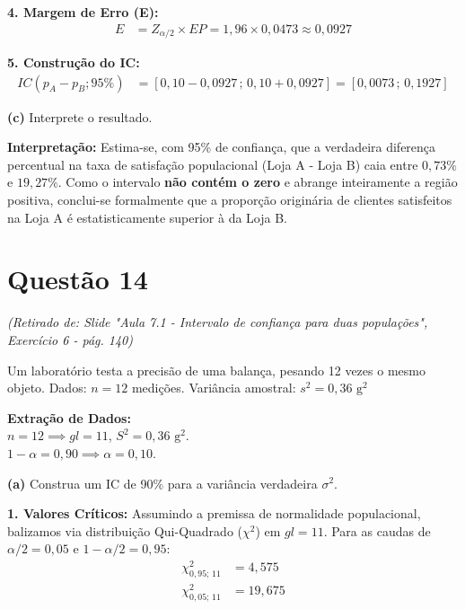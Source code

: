 \documentclass[12pt, a4paper]{article}
\begin{document}
\noindent \textbf{4. Margem de Erro (E):}
\begin{align*}
E &= Z_{\alpha/2} \times EP = 1{,}96 \times 0{,}0473 \approx \boxed{0{,}0927}
\end{align*}

\noindent \textbf{5. Construção do IC:}
\begin{align*}
IC(p_A - p_B; 95\%) &= [0{,}10 - 0{,}0927 \,;\, 0{,}10 + 0{,}0927] = \boxed{[0{,}0073 \,;\, 0{,}1927]}
\end{align*}

\medskip\noindent\textbf{(c)} Interprete o resultado.

\noindent \textbf{Interpretação:} Estima-se, com 95\% de confiança, que a verdadeira diferença percentual na taxa de satisfação populacional (Loja A - Loja B) caia entre $0{,}73\%$ e $19{,}27\%$. Como o intervalo \textbf{não contém o zero} e abrange inteiramente a região positiva, conclui-se formalmente que a proporção originária de clientes satisfeitos na Loja A é estatisticamente superior à da Loja B.

\section*{Questão 14}
\textit{(Retirado de: Slide "Aula 7.1 - Intervalo de confiança para duas populações", Exercício 6 - pág. 140)}

Um laboratório testa a precisão de uma balança, pesando 12 vezes o mesmo objeto.
Dados: $n = 12$ medições. Variância amostral: $s^2 = 0{,}36 \text{ g}^2$

\vspace{0.3cm}
\noindent\textbf{Extração de Dados:} \\
$n = 12 \implies gl = 11$, $S^2 = 0{,}36 \text{ g}^2$. \\
$1-\alpha = 0{,}90 \implies \alpha = 0{,}10$.

\medskip\noindent\textbf{(a)} Construa um IC de 90\% para a variância verdadeira $\sigma^2$.

\noindent \textbf{1. Valores Críticos:}
Assumindo a premissa de normalidade populacional, balizamos via distribuição Qui-Quadrado ($\chi^2$) em $gl = 11$. Para as caudas de $\alpha/2 = 0{,}05$ e $1-\alpha/2 = 0{,}95$:
\begin{align*}
\chi^2_{0{,}95; \, 11} &= \boxed{4{,}575} \\
\chi^2_{0{,}05; \, 11} &= \boxed{19{,}675}
\end{align*}
\end{document}
